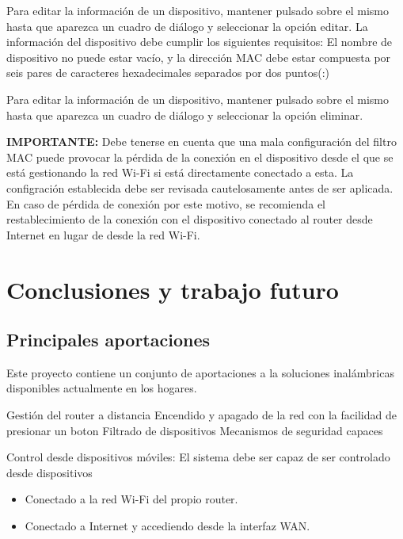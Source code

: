 \documentclass[12pt]{article}
\begin{document}
        Para editar la información de un dispositivo, mantener pulsado sobre el mismo hasta que aparezca un cuadro de diálogo y seleccionar la opción editar. La información del dispositivo debe cumplir los siguientes requisitos: El nombre de dispositivo no puede estar vacío, y la dirección MAC debe estar compuesta por seis pares de caracteres hexadecimales separados por dos puntos(:)

        Para editar la información de un dispositivo, mantener pulsado sobre el mismo hasta que aparezca un cuadro de diálogo y seleccionar la opción eliminar.

        \textbf{IMPORTANTE:} Debe tenerse en cuenta que una mala configuración del filtro MAC puede provocar la pérdida de la conexión en el dispositivo desde el que se está gestionando la red Wi-Fi si está directamente conectado a esta. La configración establecida debe ser revisada cautelosamente antes de ser aplicada. En caso de pérdida de conexión por este motivo, se recomienda el restablecimiento de la conexión con el dispositivo conectado al router desde Internet en lugar de desde la red Wi-Fi.

\section{Conclusiones y trabajo futuro}
    \subsection{Principales aportaciones}
    Este proyecto contiene un conjunto de aportaciones a la soluciones inalámbricas disponibles actualmente en los hogares.
    
    
    Gestión del router a distancia
    Encendido y apagado de la red con la facilidad de presionar un boton
    Filtrado de dispositivos
    Mecanismos de seguridad capaces 


\item Control desde dispositivos móviles:
        El sistema debe ser capaz de ser controlado desde dispositivos 
        \begin{itemize}
            \item Conectado a la red Wi-Fi del propio router.
            \item Conectado a Internet y accediendo desde la interfaz WAN.
        \end{itemize}
\end{document}
